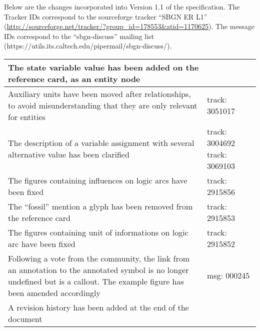 Below are the changes incorporated into Version 1.1 of the \SBGNERLone specification. The Tracker IDs correspond to the sourceforge tracker ``SBGN ER L1'' (\url{http://sourceforge.net/tracker/?group_id=178553&atid=1170625}). The message IDs correspond to the ``sbgn-discuss'' mailing list (https://utils.its.caltech.edu/pipermail/sbgn-discuss/).

\begin{center}
\label{tab:revision history 1.1}
\tablelasttail{\hline}
\begin{supertabular}{|p{0.75\textwidth}|p{0.25\textwidth}|}\hline
The state variable value has been added on the reference card, as an entity node & \\\hline
Auxiliary units have been moved after relationships, to avoid misunderstanding that they are only relevant for entities & track: 3051017\\\hline
The description of a variable assignment with several alternative value has been clarified & track: 3004692 \newline track: 3069103 \\\hline
The figures containing influences on logic arcs have been fixed & track: 2915856\\\hline
The ``fossil'' mention a glyph  has been removed from the reference card & track: 2915853\\\hline
The figures containing unit of informations on logic arc have been fixed &  track: 2915852 \\\hline
Following a vote from the community, the link from an annotation to the annotated symbol is no longer undefined but is a callout. The example figure has been amended accordingly & msg: 000245\\\hline
A revision history has been added at the end of the document& \\\hline
\end{supertabular}
\end{center}
